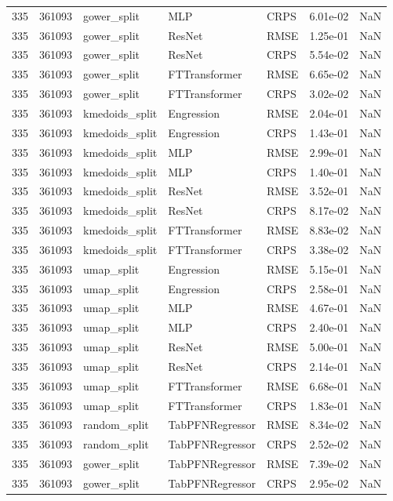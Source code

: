 \begin{tabular}{rrlllrr}
335 & 361093 & gower\_split & MLP & CRPS & 6.01e-02 & NaN \\
335 & 361093 & gower\_split & ResNet & RMSE & 1.25e-01 & NaN \\
335 & 361093 & gower\_split & ResNet & CRPS & 5.54e-02 & NaN \\
335 & 361093 & gower\_split & FTTransformer & RMSE & 6.65e-02 & NaN \\
335 & 361093 & gower\_split & FTTransformer & CRPS & 3.02e-02 & NaN \\
335 & 361093 & kmedoids\_split & Engression & RMSE & 2.04e-01 & NaN \\
335 & 361093 & kmedoids\_split & Engression & CRPS & 1.43e-01 & NaN \\
335 & 361093 & kmedoids\_split & MLP & RMSE & 2.99e-01 & NaN \\
335 & 361093 & kmedoids\_split & MLP & CRPS & 1.40e-01 & NaN \\
335 & 361093 & kmedoids\_split & ResNet & RMSE & 3.52e-01 & NaN \\
335 & 361093 & kmedoids\_split & ResNet & CRPS & 8.17e-02 & NaN \\
335 & 361093 & kmedoids\_split & FTTransformer & RMSE & 8.83e-02 & NaN \\
335 & 361093 & kmedoids\_split & FTTransformer & CRPS & 3.38e-02 & NaN \\
335 & 361093 & umap\_split & Engression & RMSE & 5.15e-01 & NaN \\
335 & 361093 & umap\_split & Engression & CRPS & 2.58e-01 & NaN \\
335 & 361093 & umap\_split & MLP & RMSE & 4.67e-01 & NaN \\
335 & 361093 & umap\_split & MLP & CRPS & 2.40e-01 & NaN \\
335 & 361093 & umap\_split & ResNet & RMSE & 5.00e-01 & NaN \\
335 & 361093 & umap\_split & ResNet & CRPS & 2.14e-01 & NaN \\
335 & 361093 & umap\_split & FTTransformer & RMSE & 6.68e-01 & NaN \\
335 & 361093 & umap\_split & FTTransformer & CRPS & 1.83e-01 & NaN \\
335 & 361093 & random\_split & TabPFNRegressor & RMSE & 8.34e-02 & NaN \\
335 & 361093 & random\_split & TabPFNRegressor & CRPS & 2.52e-02 & NaN \\
335 & 361093 & gower\_split & TabPFNRegressor & RMSE & 7.39e-02 & NaN \\
335 & 361093 & gower\_split & TabPFNRegressor & CRPS & 2.95e-02 & NaN \\

\end{tabular}
